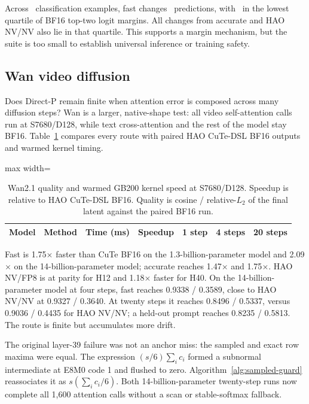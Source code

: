 Across \DownstreamClassificationSamples\ classification examples, fast
changes \DownstreamFastPredictionChanges\ predictions, with
\DownstreamFastLowMarginChanges\ in the lowest quartile of BF16 top-two logit
margins. All changes from accurate and HAO NV/NV also lie in that quartile.
This supports a margin mechanism, but the suite is too small to establish
universal inference or training safety.

\subsection{Wan video diffusion}

Does Direct-P remain finite when attention error is composed across many
diffusion steps?  Wan is a larger, native-shape test: all video self-attention
calls run at S7680/D128, while text cross-attention and the rest of the model stay BF16.
Table~\ref{tab:wan-downstream} compares every route with paired HAO CuTe-DSL
BF16 outputs and warmed kernel timing.

\begin{table}[htbp]
\centering
\caption{Wan2.1 quality and warmed GB200 kernel speed at S7680/D128. Speedup
is relative to HAO CuTe-DSL BF16. Quality is cosine / relative-$L_2$ of the
final latent against the paired BF16 run.}
\label{tab:wan-downstream}
\scriptsize
\begin{adjustbox}{max width=\textwidth}
\begin{tabular}{llrrccc}
\toprule
Model & Method & Time (ms) & Speedup & 1 step & 4 steps & 20 steps \\
\midrule
%
\end{tabular}
\end{adjustbox}
\end{table}

Fast is 1.75$\times$ faster than CuTe BF16 on the 1.3-billion-parameter model
and 2.09$\times$ on the 14-billion-parameter model; accurate reaches
1.47$\times$ and 1.75$\times$. HAO NV/FP8 is at parity for H12 and
1.18$\times$ faster for H40. On the 14-billion-parameter model at four steps,
fast reaches 0.9338 / 0.3589, close to HAO NV/NV at 0.9327 / 0.3640. At twenty
steps it reaches 0.8496 / 0.5337, versus 0.9036 / 0.4435 for HAO NV/NV; a
held-out prompt reaches 0.8235 / 0.5813. The route is finite but accumulates
more drift.

The original layer-39 failure was not an anchor miss: the sampled and exact
row maxima were equal. The expression $(s/6)\sum_i c_i$ formed a subnormal
intermediate at E8M0 code 1 and flushed to zero. Algorithm~\ref{alg:sampled-guard}
reassociates it as $s(\sum_i c_i/6)$. Both 14-billion-parameter twenty-step
runs now complete all 1,600 attention calls without a scan or stable-softmax
fallback.

